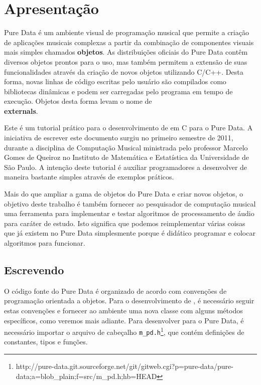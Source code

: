  
\chapter{Apresentação}

Pure Data é um ambiente visual de programação musical que permite a criação de
aplicações musicais complexas a partir da combinação de componentes visuais
mais simples chamados \textbf{objetos}. As distribuições oficiais do Pure Data
contêm diversos objetos prontos para o uso, mas também permitem a extensão de
suas funcionalidades através da criação de novos objetos utilizando C/C++.
Desta forma, novas linhas de código escritas pelo usuário são compilados como
bibliotecas dinâmicas e podem ser carregadas pelo programa em tempo de
execução. Objetos desta forma levam o nome de \textbf{\\externals}.

Este é um tutorial prático para o desenvolvimento de \externals em C para o
Pure Data. A iniciativa de escrever este documento surgiu no primeiro semestre
de 2011, durante a disciplina de Computação Musical ministrada pelo professor
Marcelo Gomes de Queiroz no Instituto de Matemática e Estatística da
Universidade de São Paulo. A intenção deste tutorial é auxiliar programadores
a desenvolver \externals de maneira bastante simples através de exemplos
práticos.

Mais do que ampliar a gama de objetos do Pure Data e criar novos objetos, o
objetivo deste trabalho é também fornecer ao pesquisador de computação musical
uma ferramenta para implementar e testar algoritmos de processamento de áudio
para caráter de estudo. Isto significa que podemos reimplementar várias coisas
que já existem no Pure Data simplesmente porque é didático programar e colocar
algoritmos para funcionar.

\section{Escrevendo \externals}

O código fonte do Pure Data é organizado de acordo com convenções de
programação orientada a objetos. Para o desenvolvimento de \externals, é
necessário seguir estas convenções e fornecer ao ambiente uma nova classe com
alguns métodos específicos, como veremos mais adiante. Para desenvolver para o
Pure Data, é necessário importar o arquivo de cabeçalho
\texttt{m\_pd.h}\footnote{http://pure-data.git.sourceforge.net/git/gitweb.cgi?p=pure-data/pure-data;a=blob\_plain;f=src/m\_pd.h;hb=HEAD},
que contém definições de constantes, tipos e funções.


